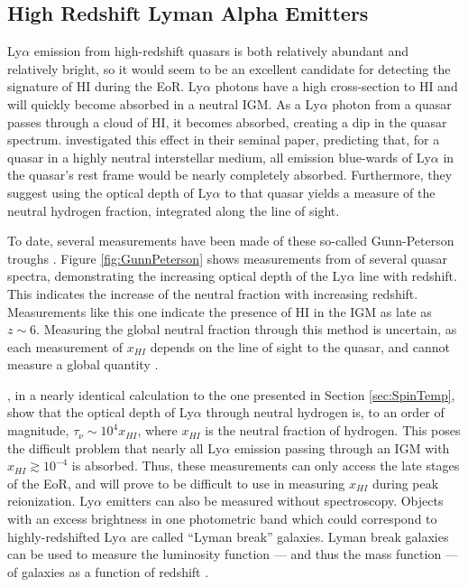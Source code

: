 \subsection{High Redshift Lyman Alpha Emitters}

Ly$\alpha$ emission from high-redshift quasars is both relatively abundant and relatively
bright, so it would seem to be an excellent candidate for detecting the signature of HI during the 
EoR. Ly$\alpha$ photons have a high cross-section to HI and will quickly become absorbed in a
neutral IGM. As a Ly$\alpha$ photon from a quasar passes through a cloud of HI, it becomes
absorbed, creating a dip in the quasar spectrum. \citet{GunnPeterson} investigated this effect in
their seminal paper, predicting that, for a quasar in a highly neutral interstellar medium, all
emission blue-wards of Ly$\alpha$ in the quasar's rest frame would be nearly completely 
absorbed. Furthermore, they suggest using the optical depth of Ly$\alpha$ to that quasar yields
a measure of the neutral hydrogen fraction, integrated along the line of sight. 

To date, several measurements have been made of these so-called Gunn-Peterson troughs
\cite[][e.g.]{Fan2006,Becker2001}. Figure \ref{fig:GunnPeterson} shows measurements from
\citet{Becker2001} of several quasar spectra, demonstrating the increasing optical depth of the
Ly$\alpha$ line with redshift. This indicates the increase of the neutral fraction with
increasing redshift. Measurements like this one indicate the presence of HI in the IGM as late as
$z\sim6$. Measuring the global neutral fraction through this method is uncertain, as each
measurement of $x_{HI}$ depends on the line of sight to the quasar, and cannot measure a global
quantity \cite{Taylor2014}.

\citet{GunnPeterson}, in a nearly identical calculation to the one presented in Section 
\ref{sec:SpinTemp}, show that the optical depth of Ly$\alpha$ through neutral hydrogen 
is, to an order of magnitude, $\tau_\nu \sim 10^4x_{HI}$, where $x_{HI}$ is the neutral fraction of 
hydrogen. This poses the difficult problem that nearly all Ly$\alpha$ emission passing 
through an IGM with $x_{HI} \gtrsim 10^{-4}$ is absorbed. Thus, these measurements can only access the
late stages of the EoR, and will prove to be difficult to use in measuring $x_{HI}$ during peak
reionization. 
Ly$\alpha$ emitters can also be measured without spectroscopy. Objects with an excess
brightness in one photometric band which could correspond to highly-redshifted Ly$\alpha$
are called ``Lyman break'' galaxies. Lyman break galaxies can be used to measure the luminosity function 
--- and thus the mass function --- of galaxies as a function of redshift \citet[][e.g.]{Bouwens2011}. 

